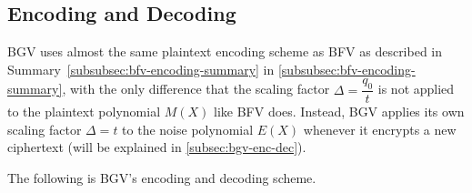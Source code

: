 \clearpage

\subsection{Encoding and Decoding}
\label{subsec:bgv-encoding-decoding}

BGV uses almost the same plaintext encoding scheme as BFV as described in Summary~\ref{subsubsec:bfv-encoding-summary} in \autoref{subsubsec:bfv-encoding-summary}, with the only difference that the scaling factor $\Delta = \dfrac{q_0}{t}$ is not applied to the plaintext polynomial $M(X)$ like BFV does. Instead, BGV applies its own scaling factor $\Delta = t$ to the noise polynomial $E(X)$ whenever it encrypts a new ciphertext (will be explained in \autoref{subsec:bgv-enc-dec}). 

The following is BGV's encoding and decoding scheme. 

